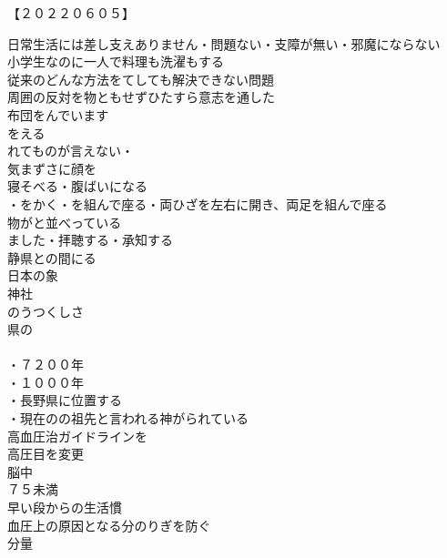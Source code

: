\begin{multicols}{2}
【２０２２０６０５】\\
\end{multicols}

日常生活には差し支えありません・問題ない・支障が無い・邪魔にならない\\
小学生なのに一人で料理も洗濯もする\\
従来のどんな方法をてしても解決できない問題\\
周囲の反対を物ともせずひたすら意志を通した\\

布団をんでいます\\
をえる\\
れてものが言えない・\\
気まずさに顔を\\
寝そべる・腹ばいになる\\
・をかく・を組んで座る・両ひざを左右に開き、両足を組んで座る\\
物がと並べっている\\
ました・拝聴する・承知する\\

静県との間にる\\
日本の象\\
神社\\
のうつくしさ\\
県の\\
\\
・７２００年\\
・１０００年\\
・長野県に位置する\\
・現在のの祖先と言われる神がられている\\

高血圧治ガイドラインを\\
高圧目を変更\\
脳中\\
７５未満\\
早い段からの生活慣\\
血圧上の原因となる分のりぎを防ぐ\\
分量\\
\\

